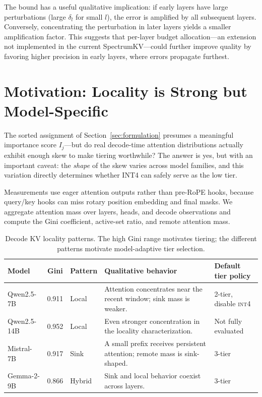 \documentclass[11pt]{article}
\newcommand{\method}{SpectrumKV}
\newcommand{\intiv}{\textsc{int4}}
\theoremstyle{plain}
\theoremstyle{definition}
\begin{document}
The bound has a useful qualitative implication: if early layers have large perturbations (large $\delta_l$ for small $l$), the error is amplified by all subsequent layers.  Conversely, concentrating the perturbation in later layers yields a smaller amplification factor.  This suggests that per-layer budget allocation---an extension not implemented in the current \method{}---could further improve quality by favoring higher precision in early layers, where errors propagate furthest.

\section{Motivation: Locality is Strong but Model-Specific}
\label{sec:motivation}

The sorted assignment of Section~\ref{sec:formulation} presumes a meaningful importance score $I_j$---but do real decode-time attention distributions actually exhibit enough skew to make tiering worthwhile?  The answer is yes, but with an important caveat: the \emph{shape} of the skew varies across model families, and this variation directly determines whether INT4 can safely serve as the low tier.

Measurements use eager attention outputs rather than pre-RoPE hooks, because query/key hooks can miss rotary position embedding and final masks.  We aggregate attention mass over layers, heads, and decode observations and compute the Gini coefficient, active-set ratio, and remote attention mass.

\begin{table}[t]
\centering
\caption{Decode KV locality patterns.  The high Gini range motivates tiering; the different patterns motivate model-adaptive tier selection.}
\label{tab:locality}
\begin{tabularx}{\linewidth}{lclYl}
\toprule
Model & Gini & Pattern & Qualitative behavior & Default tier policy \\
\midrule
Qwen2.5-7B & 0.911 & Local & Attention concentrates near the recent window; sink mass is weaker. & 2-tier, disable \intiv{} \\
Qwen2.5-14B & 0.952 & Local & Even stronger concentration in the locality characterization. & Not fully evaluated \\
Mistral-7B & 0.917 & Sink & A small prefix receives persistent attention; remote mass is sink-shaped. & 3-tier \\
Gemma-2-9B & 0.866 & Hybrid & Sink and local behavior coexist across layers. & 3-tier \\
\bottomrule
\end{tabularx}
\end{table}
\end{document}
